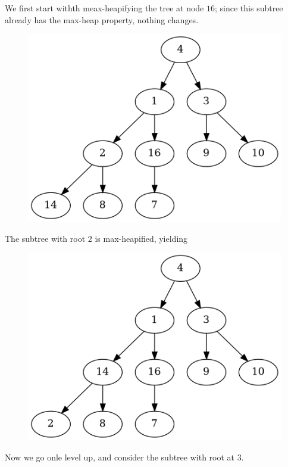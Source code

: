 We first start withth meax-heapifying the tree at node $16$; since this subtree already has the max-heap property, nothing changes.

\begin{figure}[H]
\centering
\includegraphics[scale=0.5]{images/heapsort_11.png}
\end{figure}

The subtree with root $2$ is max-heapified, yielding

\begin{figure}[H]
\centering
\includegraphics[scale=0.5]{images/heapsort_12.png}
\end{figure}

Now we go onle level up, and consider the subtree with root at $3$.

